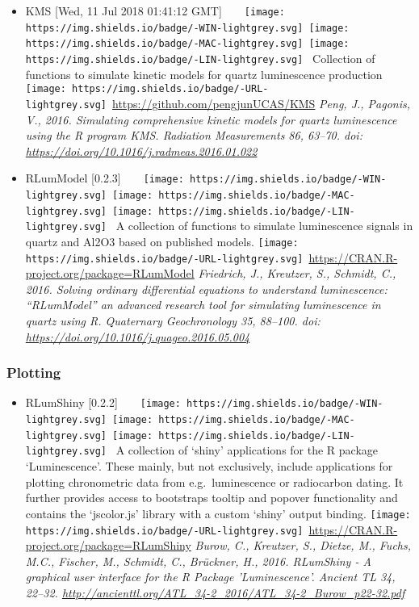 \documentclass[]{article}
\providecommand{\tightlist}{%
  \setlength{\itemsep}{0pt}\setlength{\parskip}{0pt}}
\begin{document}
\begin{itemize}
\tightlist
\item
  KMS {[}Wed, 11 Jul 2018 01:41:12 GMT{]}~~~~\texttt{[image: https://img.shields.io/badge/-WIN-lightgrey.svg]}~\texttt{[image: https://img.shields.io/badge/-MAC-lightgrey.svg]}~\texttt{[image: https://img.shields.io/badge/-LIN-lightgrey.svg]}~
  Collection of functions to simulate kinetic models for quartz luminescence production
  \texttt{[image: https://img.shields.io/badge/-URL-lightgrey.svg]}~\url{https://github.com/pengjunUCAS/KMS}
  \emph{Peng, J., Pagonis, V., 2016. Simulating comprehensive kinetic models for quartz luminescence using the R program KMS. Radiation Measurements 86, 63--70. doi: \url{https://doi.org/10.1016/j.radmeas.2016.01.022}}
\item
  RLumModel {[}0.2.3{]}~~~~\texttt{[image: https://img.shields.io/badge/-WIN-lightgrey.svg]}~\texttt{[image: https://img.shields.io/badge/-MAC-lightgrey.svg]}~\texttt{[image: https://img.shields.io/badge/-LIN-lightgrey.svg]}~
  A collection of functions to simulate luminescence signals in quartz and Al2O3 based on published models.
  \texttt{[image: https://img.shields.io/badge/-URL-lightgrey.svg]}~\url{https://CRAN.R-project.org/package=RLumModel}
  \emph{Friedrich, J., Kreutzer, S., Schmidt, C., 2016. Solving ordinary differential equations to understand luminescence: ``RLumModel'' an advanced research tool for simulating luminescence in quartz using R. Quaternary Geochronology 35, 88--100. doi: \url{https://doi.org/10.1016/j.quageo.2016.05.004}}
\end{itemize}

\hypertarget{plotting}{%
\subsubsection{Plotting}\label{plotting}}

\begin{itemize}
\tightlist
\item
  RLumShiny {[}0.2.2{]}~~~~\texttt{[image: https://img.shields.io/badge/-WIN-lightgrey.svg]}~\texttt{[image: https://img.shields.io/badge/-MAC-lightgrey.svg]}~\texttt{[image: https://img.shields.io/badge/-LIN-lightgrey.svg]}~
  A collection of `shiny' applications for the R package
  `Luminescence'. These mainly, but not exclusively, include applications for
  plotting chronometric data from e.g.~luminescence or radiocarbon dating. It
  further provides access to bootstraps tooltip and popover functionality and
  contains the `jscolor.js' library with a custom `shiny' output binding.
  \texttt{[image: https://img.shields.io/badge/-URL-lightgrey.svg]}~\url{https://CRAN.R-project.org/package=RLumShiny}
  \emph{Burow, C., Kreutzer, S., Dietze, M., Fuchs, M.C., Fischer, M., Schmidt, C., Brückner, H., 2016. RLumShiny - A graphical user interface for the R Package 'Luminescence'. Ancient TL 34, 22--32. \url{http://ancienttl.org/ATL_34-2_2016/ATL_34-2_Burow_p22-32.pdf}}
\end{itemize}
\end{document}
